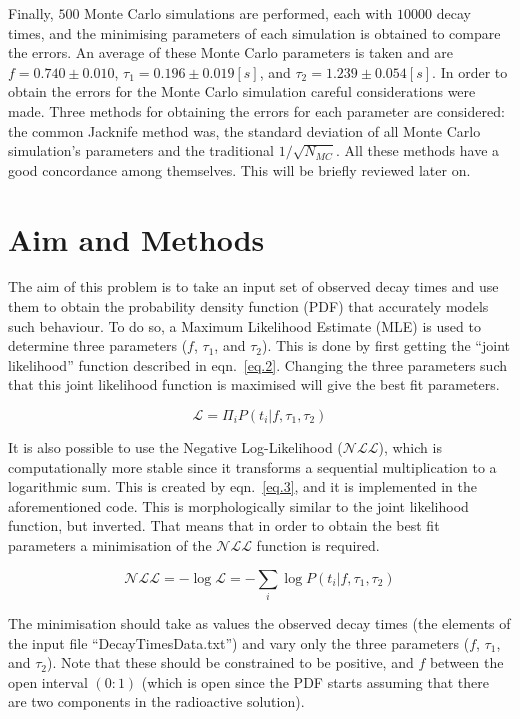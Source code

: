 \documentclass[a4paper,12pt]{article}
\begin{document}
Finally, $500$ Monte Carlo simulations are performed, each with $10000$ decay times, and the minimising parameters of each simulation is obtained to compare the errors. An average of these Monte Carlo parameters is taken and are $f=0.740 \pm 0.010$, $\tau_1=0.196 \pm 0.019 [s]$, and $\tau_2=1.239 \pm 0.054 [s]$. In order to obtain the errors for the Monte Carlo simulation careful considerations were made. Three methods for obtaining the errors for each parameter are considered: the common Jacknife method was, the standard deviation of all Monte Carlo simulation's parameters and the traditional $1/\sqrt{N_{MC}}$. All these methods have a good concordance among themselves. This will be briefly reviewed later on.

\section{Aim and Methods}

The aim of this problem is to take an input set of observed decay times and use them to obtain the probability density function (PDF) that accurately models such behaviour. To do so, a Maximum Likelihood Estimate (MLE) is used to determine three parameters ($f$, $\tau_1$, and $\tau_2$). This is done by first getting the ``joint likelihood'' function described in eqn.~\ref{eq.2}. Changing the three parameters such that this joint likelihood function is maximised will give the best fit parameters.

\begin{equation}
 \mathcal{L} = \Pi_i P(t_i \vert f, \tau_1, \tau_2)
 \label{eq.2}
\end{equation}

It is also possible to use the Negative Log-Likelihood ($\mathcal{NLL}$), which is computationally more stable since it transforms a sequential multiplication to a logarithmic sum. This is created by eqn.~\ref{eq.3}, and it is implemented in the aforementioned code. This is morphologically similar to the joint likelihood function, but inverted. That means that in order to obtain the best fit parameters a minimisation of the $\mathcal{NLL}$ function is required.

\begin{equation}
 \mathcal{NLL} = -\log \mathcal{L} = - \sum_i \log P(t_i \vert f, \tau_1, \tau_2)
 \label{eq.3}
\end{equation}

The minimisation should take as values the observed decay times (the elements of the input file ``DecayTimesData.txt'') and vary only the three parameters ($f$, $\tau_1$, and $\tau_2$). Note that these should be constrained to be positive, and $f$ between the open interval $(0:1)$ (which is open since the PDF starts assuming that there are two components in the radioactive solution). 
\end{document}

